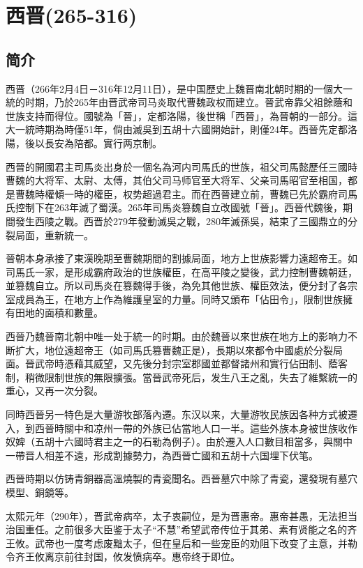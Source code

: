 
\chapter{西晋\tiny(265-316)}

\section{简介}

西晋（266年2月4日－316年12月11日），是中国歷史上魏晋南北朝时期的一個大一統的时期，乃於265年由晋武帝司马炎取代曹魏政权而建立。晉武帝靠父祖餘蔭和世族支持而得位。國號為「晉」，定都洛陽，後世稱「西晉」，為晉朝的一部分。這大一統時期為時僅51年，倘由滅吳到五胡十六國開始計，則僅24年。西晉先定都洛陽，後以長安為陪都。實行两京制。

西晉的開國君主司馬炎出身於一個名為河内司馬氏的世族，祖父司馬懿歷任三國時曹魏的大将军、太尉、太傅，其伯父司马师官至大将军、父亲司馬昭官至相国，都是曹魏時權傾一時的權臣，权势超過君主。而在西晉建立前，曹魏已先於霸府司馬氏控制下在263年滅了蜀漢。265年司馬炎篡魏自立改國號「晉」。西晉代魏後，期間發生西陵之戰。西晋於279年發動滅吳之戰，280年滅孫吳，結束了三國鼎立的分裂局面，重新統一。

晉朝本身承接了東漢晚期至曹魏期間的割據局面，地方上世族影響力遠超帝王。如司馬氏一家，是形成霸府政治的世族權臣，在高平陵之變後，武力控制曹魏朝廷，並篡魏自立。所以司馬炎在篡魏得手後，為免其他世族、權臣效法，便分封了各宗室成員為王，在地方上作為維護皇室的力量。同時又頒布「佔田令」，限制世族擁有田地的面積和數量。

西晉乃魏晉南北朝中唯一处于統一的时期。由於魏晉以來世族在地方上的影响力不断扩大，地位遠超帝王（如司馬氏篡曹魏正是），長期以來都令中國處於分裂局面。晉武帝時憑藉其威望，又先後分封宗室郡國並都督諸州和實行佔田制、蔭客制，稍微限制世族的無限擴張。當晉武帝死后，发生八王之亂，失去了維繫統一的重心，又再一次分裂。

同時西晉另一特色是大量游牧部落內遷。东汉以来，大量游牧民族因各种方式被遷入，到西晉時關中和凉州一帶的外族已佔當地人口一半。這些外族本身被世族收作奴婢（五胡十六國時君主之一的石勒為例子）。由於遷入人口數目相當多，與關中一帶晋人相差不遠，形成割據勢力，為西晉亡國和五胡十六国埋下伏笔。

西晉時期以仿铸青銅器高溫燒製的青瓷聞名。西晉墓穴中除了青瓷，還發現有墓穴模型、銅鏡等。

太熙元年（290年），晋武帝病卒，太子衷嗣位，是为晋惠帝。惠帝甚愚，无法担当治国重任。之前很多大臣鉴于太子“不慧”希望武帝传位于其弟、素有贤能之名的齐王攸。武帝也一度考虑废黜太子，但在皇后和一些宠臣的劝阻下改变了主意，并勒令齐王攸离京前往封国，攸发愤病卒。惠帝终于即位。

